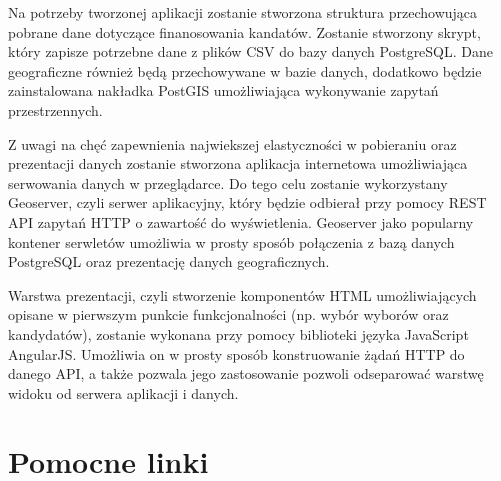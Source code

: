 \documentclass[10pt,a4paper]{article}
\begin{document}
Na potrzeby tworzonej aplikacji zostanie stworzona struktura przechowująca pobrane dane dotyczące finanosowania kandatów. Zostanie stworzony skrypt, który zapisze potrzebne dane z plików CSV do bazy danych PostgreSQL. Dane geograficzne również będą przechowywane w bazie danych, dodatkowo będzie zainstalowana nakładka PostGIS umożliwiająca wykonywanie zapytań przestrzennych.

Z uwagi na chęć zapewnienia najwiekszej elastyczności w pobieraniu oraz prezentacji danych zostanie stworzona aplikacja internetowa umożliwiająca serwowania danych w przeglądarce. Do tego celu zostanie wykorzystany Geoserver, czyli serwer aplikacyjny, który będzie odbierał przy pomocy REST API zapytań HTTP o zawartość do wyświetlenia. Geoserver jako popularny kontener serwletów umożliwia w prosty sposób połączenia z bazą danych PostgreSQL oraz prezentację danych geograficznych.

Warstwa prezentacji, czyli stworzenie komponentów HTML umożliwiających opisane w pierwszym punkcie funkcjonalności (np. wybór wyborów oraz kandydatów), zostanie wykonana przy pomocy biblioteki języka JavaScript AngularJS. Umożliwia on w prosty sposób konstruowanie żądań HTTP do danego API, a także pozwala jego zastosowanie pozwoli odseparować warstwę widoku od serwera aplikacji i danych. 

\section{Pomocne linki}
\end{document}
